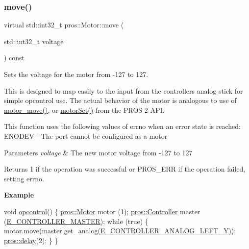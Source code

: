 \subsubsection{\texorpdfstring{move()}{move()}}
{\footnotesize\ttfamily virtual std\+::int32\+\_\+t pros\+::\+Motor\+::move (\begin{DoxyParamCaption}\item[{std\+::int32\+\_\+t}]{voltage }\end{DoxyParamCaption}) const\hspace{0.3cm}{\ttfamily [virtual]}}



Sets the voltage for the motor from -\/127 to 127. 

This is designed to map easily to the input from the controller\textquotesingle{}s analog stick for simple opcontrol use. The actual behavior of the motor is analogous to use of \hyperlink{motors_8h_a7da9bf1e229e50bfeeaecf026a6d0d08}{motor\+\_\+move()}, or \hyperlink{api__legacy_8h_a59a0d6bd050cd259ad488e68f856ae81}{motor\+Set()} from the P\+R\+OS 2 A\+PI.

This function uses the following values of errno when an error state is reached\+: E\+N\+O\+D\+EV -\/ The port cannot be configured as a motor


\begin{DoxyParams}{Parameters}
{\em voltage} & The new motor voltage from -\/127 to 127\\
\hline
\end{DoxyParams}
\begin{DoxyReturn}{Returns}
1 if the operation was successful or P\+R\+O\+S\+\_\+\+E\+RR if the operation failed, setting errno.
\end{DoxyReturn}
{\bfseries Example} 
\begin{DoxyCode}
\textcolor{keywordtype}{void} \hyperlink{main_8h_a1903abdb5ef0f301d660754c8315fc17}{opcontrol}() \{
  \hyperlink{classpros_1_1Motor}{pros::Motor} motor (1);
  \hyperlink{classpros_1_1Controller}{pros::Controller} master (\hyperlink{misc_8h_af1323f00203099060d46f722b1fbd460a1c9d9311575877d185c44df1cadad226}{E\_CONTROLLER\_MASTER});
  \textcolor{keywordflow}{while} (\textcolor{keyword}{true}) \{
    motor.move(master.get\_analog(\hyperlink{misc_8h_a8bdd0963e2bc0d4fbe03435eee8a5ca5ac68939b7adc180b25b95367fd0098e99}{E\_CONTROLLER\_ANALOG\_LEFT\_Y}));
    \hyperlink{rtos_8h_ab8c5a8048d5576a33d7f79b95a2fa0dd}{pros::delay}(2);
  \}
\}
\end{DoxyCode}
 \mbox{\label{classpros_1_1Motor_a7851ffa40c9803d75398a5be355de395}} 
